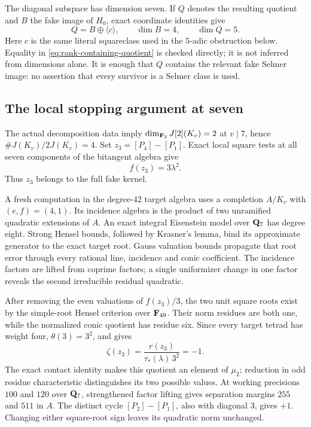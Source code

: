 The diagonal subspace has dimension seven.  If $Q$ denotes the resulting
quotient and $B$ the fake image of $H_0$, exact coordinate identities give
\begin{equation}\label{eq:rank-containing-quotient}
 Q=B\oplus\langle c\rangle,\qquad \dim B=4,\qquad \dim Q=5.
\end{equation}
Here $c$ is the same literal squareclass used in the $5$-adic obstruction
below.  Equality in \eqref{eq:rank-containing-quotient} is checked directly;
it is not inferred from dimensions alone.  It is enough that $Q$ contains
the relevant fake Selmer image: no assertion that every survivor is a
Selmer class is used.

\subsection{The local stopping argument at seven}

The actual decomposition data imply
$\dim_{\mathbf F_2}J[2](K_v)=2$ at $v\mid7$, hence
$\#J(K_v)/2J(K_v)=4$.  Set $z_3=[P_4]-[P_1]$.  Exact local square tests
at all seven components of the bitangent algebra give
\[
                      f(z_3)=3\lambda^2.
\]
Thus $z_3$ belongs to the full fake kernel.

A fresh computation in the degree-$42$ target algebra uses a completion
$A/K_v$ with $(e,f)=(4,1)$.  Its incidence algebra is the product of two
unramified quadratic extensions of $A$.  An exact integral Eisenstein
model over $\mathbf Q_7$ has degree eight.  Strong Hensel bounds, followed by
Krasner's lemma, bind its approximate generator to the exact target root.
Gauss valuation bounds propagate that root error through every rational
line, incidence and conic coefficient.  The incidence factors are lifted
from coprime factors; a single uniformizer change in one factor reveals
the second irreducible residual quadratic.

After removing the even valuations of $f(z_3)/3$, the two unit square roots
exist by the simple-root Hensel criterion over $\mathbf F_{49}$.  Their norm
residues are both one, while the normalized conic quotient has residue
six.  Since every target tetrad has weight four, $\theta(3)=3^2$, and
\cite[Lemma~A.24(a)]{BPS} gives
\[
 \zeta(z_3)=\frac{r(z_3)}{\tau_*(\lambda)\,3^2}=-1.
\]
The exact contact identity makes this quotient an element of $\mu_2$;
reduction in odd residue characteristic distinguishes its two possible
values.  At working precisions $100$ and $120$ over $\mathbf Q_7$, strengthened
factor lifting gives separation margins $255$ and $511$ in $A$.
The distinct cycle $[P_2]-[P_1]$, also with diagonal $3$, gives $+1$.
Changing either square-root sign leaves its quadratic norm unchanged.

